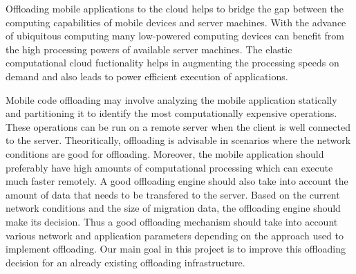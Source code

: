 Offloading mobile applications to the cloud helps to bridge the gap between the computing capabilities
of mobile devices and server machines. With the advance of ubiquitous computing many low-powered computing
devices can benefit from the high processing powers of available server machines. The elastic computational
cloud fuctionality helps in augmenting the processing speeds on demand and also leads to power efficient execution
of applications.

Mobile code offloading may involve analyzing the mobile application statically and partitioning it to identify the
most computationally expensive operations. These operations can be run on a remote server when the client is well
connected to the server. Theoritically, offloading is advisable in scenarios where the network conditions are good
for offloading. Moreover, the mobile application should preferably have high amounts of computational processing
which can execute much faster remotely. A good offloading engine should also take into account the amount of data that
needs to be transfered to the server. Based on the current network conditions and the size of migration data, the offloading
engine should make its decision. Thus a good offloading mechanism should take into account various network and application
parameters depending on the approach used to implement offloading. Our main goal in this project is to improve this offloading
decision for an already existing offloading infrastructure.

